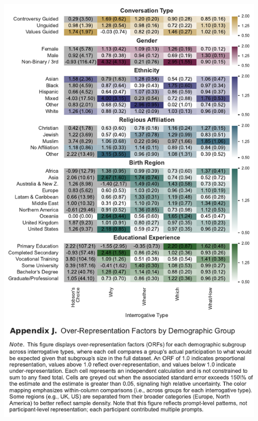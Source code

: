 \documentclass[
  12pt,
]{article}
\begin{document}
\includegraphics{../03_outputs/02_descriptive_analyses/appendix_j.pdf}
\end{document}
